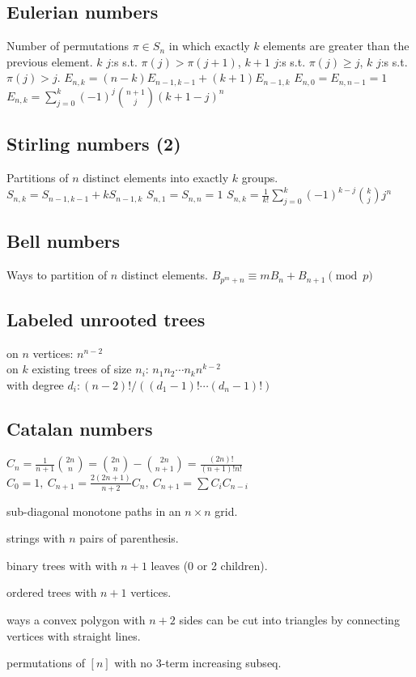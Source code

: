 	\subsection{Eulerian numbers}
		Number of permutations $\pi \in S_n$ in which exactly $k$ elements are greater than the previous element. $k$ $j$:s s.t. $\pi(j)>\pi(j+1)$, $k+1$ $j$:s s.t. $\pi(j)\geq j$, $k$ $j$:s s.t. $\pi(j)>j$.
		$E_{n,k} = (n-k)E_{n-1,k-1} + (k+1)E_{n-1,k}$
		$E_{n,0} = E_{n,n-1} = 1$
		$E_{n,k} = \sum_{j=0}^k(-1)^j\binom{n+1}{j}(k+1-j)^n$

	\subsection{Stirling numbers (2)}
		Partitions of $n$ distinct elements into exactly $k$ groups.
		$S_{n,k} = S_{n-1,k-1} + k S_{n-1,k}$
		$S_{n,1} = S_{n,n} = 1$
		$S_{n,k} = \frac{1}{k!}\sum_{j=0}^k (-1)^{k-j}\binom{k}{j}j^n$

	\subsection{Bell numbers}
		Ways to partition of $n$ distinct elements. 
		$B_{p^m+n}\equiv mB_{n}+B_{n+1} \pmod{p}$

	\subsection{Labeled unrooted trees}
		on $n$ vertices: $n^{n-2}$ \\
		on $k$ existing trees of size $n_i$: $n_1n_2\cdots n_k n^{k-2}$ \\
		with degree $d_i: (n-2)! / ((d_1-1)! \cdots (d_n-1)!)$

	\subsection{Catalan numbers}
		$C_n=\frac{1}{n+1}\binom{2n}{n}= \binom{2n}{n}-\binom{2n}{n+1} = \frac{(2n)!}{(n+1)!n!}$
		$ C_0=1,\ C_{n+1} = \frac{2(2n+1)}{n+2}C_n,\ C_{n+1}=\sum C_iC_{n-i}$
		\begin{itemize*}[noitemsep]
			\item sub-diagonal monotone paths in an $n\times n$ grid.
			\item strings with $n$ pairs of parenthesis.
			\item binary trees with with $n+1$ leaves (0 or 2 children).
			\item ordered trees with $n+1$ vertices.
			\item ways a convex polygon with $n+2$ sides can be cut into triangles by connecting vertices with straight lines.
			\item permutations of $[n]$ with no 3-term increasing subseq.
		\end{itemize*}
